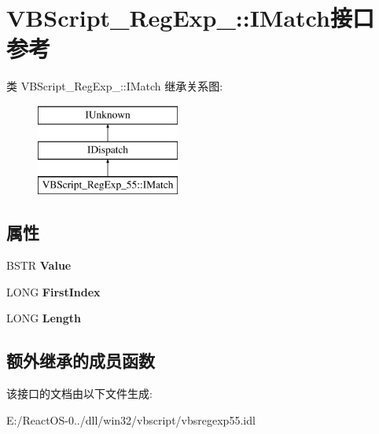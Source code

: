 \hypertarget{interface_v_b_script___reg_exp__55_1_1_i_match}{}\section{V\+B\+Script\+\_\+\+Reg\+Exp\+\_\+:\+:I\+Match接口 参考}
\label{interface_v_b_script___reg_exp__55_1_1_i_match}
类 V\+B\+Script\+\_\+\+Reg\+Exp\+\_\+:\+:I\+Match 继承关系图\+:\begin{figure}[H]
\begin{center}
\leavevmode
\includegraphics[height=3.000000cm]{interface_v_b_script___reg_exp__55_1_1_i_match}
\end{center}
\end{figure}
\subsection*{属性}
\begin{DoxyCompactItemize}
\item 
\mbox{\label{interface_v_b_script___reg_exp__55_1_1_i_match_a64c3c147d7d4c6b74f8d7123f1b851e2}} 
B\+S\+TR {\bfseries Value}
\item 
\mbox{\label{interface_v_b_script___reg_exp__55_1_1_i_match_aa5522bf00885638c25fa4d20627cad14}} 
L\+O\+NG {\bfseries First\+Index}
\item 
\mbox{\label{interface_v_b_script___reg_exp__55_1_1_i_match_a86a0618281b369865e2977fe2f4389d8}} 
L\+O\+NG {\bfseries Length}
\end{DoxyCompactItemize}
\subsection*{额外继承的成员函数}


该接口的文档由以下文件生成\+:\begin{DoxyCompactItemize}
\item 
E\+:/\+React\+O\+S-\/0../dll/win32/vbscript/vbsregexp55.\+idl\end{DoxyCompactItemize}
